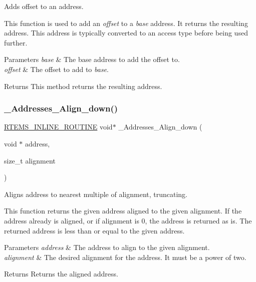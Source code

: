 Adds offset to an address. 

This function is used to add an {\itshape offset} to a {\itshape base} address. It returns the resulting address. This address is typically converted to an access type before being used further.


\begin{DoxyParams}{Parameters}
{\em base} & The base address to add the offset to. \\
\hline
{\em offset} & The offset to add to {\itshape base}.\\
\hline
\end{DoxyParams}
\begin{DoxyReturn}{Returns}
This method returns the resulting address. 
\end{DoxyReturn}
\mbox{\label{group__RTEMSScoreAddress_ga967a04986a1d8fa307680f56cfd31e40}} 
\subsubsection{\texorpdfstring{\_Addresses\_Align\_down()}{\_Addresses\_Align\_down()}}
{\footnotesize\ttfamily \mbox{\hyperlink{group__RTEMSScoreBaseDefs_gac216239df231d5dbd15e3520b0b9313f}{R\+T\+E\+M\+S\+\_\+\+I\+N\+L\+I\+N\+E\+\_\+\+R\+O\+U\+T\+I\+NE}} void$\ast$ \+\_\+\+Addresses\+\_\+\+Align\+\_\+down (\begin{DoxyParamCaption}\item[{void $\ast$}]{address,  }\item[{size\+\_\+t}]{alignment }\end{DoxyParamCaption})}



Aligns address to nearest multiple of alignment, truncating. 

This function returns the given address aligned to the given alignment. If the address already is aligned, or if alignment is 0, the address is returned as is. The returned address is less than or equal to the given address.


\begin{DoxyParams}{Parameters}
{\em address} & The address to align to the given alignment. \\
\hline
{\em alignment} & The desired alignment for the address. It must be a power of two.\\
\hline
\end{DoxyParams}
\begin{DoxyReturn}{Returns}
Returns the aligned address. 
\end{DoxyReturn}
\mbox{\label{group__RTEMSScoreAddress_gab881c4be346d10ae3d5b23ed38185600}} 
